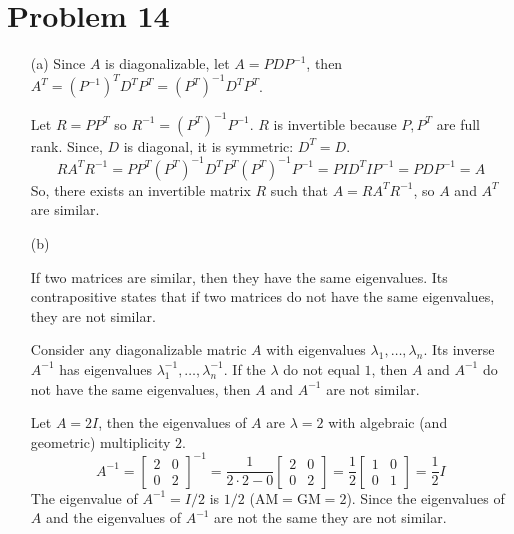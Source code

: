 \documentclass{article}
\newcommand*{\problem}[1]{\section*{Problem #1}}
\begin{document}
\problem{14}
\begin{itemize}
	\item[(a)] Since $A$ is diagonalizable, let $A=PDP^{-1}$, then $A^T=\left(P^{-1}\right)^T D^T P^T=\left(P^T\right)^{-1} D^TP^T$. 

	Let $R=PP^T$ so $R^{-1}=\left(P^{T}\right)^{-1}P^{-1}$. $R$ is invertible because $P,P^T$ are full rank. Since, $D$ is diagonal, it is symmetric: $D^T=D$.
	\begin{equation*}
		RA^TR^{-1}
		=PP^T \left(P^T\right)^{-1}D^T P^T \left(P^T\right)^{-1}P^{-1}
		=PID^TIP^{-1}
		=PDP^{-1}
		=A
	\end{equation*}
	So, there exists an invertible matrix $R$ such that $A=RA^TR^{-1}$, so $A$ and $A^T$ are similar.

	\item[(b)]  \phantom{}

	\begin{mdframed}
		If two matrices are similar, then they have the same eigenvalues. Its contrapositive states that if two matrices do not have the same eigenvalues, they are not similar.

		Consider any diagonalizable matric $A$ with eigenvalues $\lambda_1,\ldots,\lambda_n$. Its inverse $A^{-1}$ has eigenvalues $\lambda_1^{-1},\ldots,\lambda_n^{-1}$. If the $\lambda$ do not equal $1$, then $A$ and $A^{-1}$ do not have the same eigenvalues, then $A$ and $A^{-1}$ are not similar.
	\end{mdframed}

	Let $A=2I$, then the eigenvalues of $A$ are $\lambda=2$ with algebraic (and geometric) multiplicity $2$.
	\begin{equation*}
		A^{-1}=\begin{bmatrix}
			2 & 0 \\
			0 & 2
		\end{bmatrix}^{-1}
		=\frac{1}{2\cdot2-0}\begin{bmatrix}
			2 & 0 \\
			0 & 2
		\end{bmatrix}
		=\frac{1}{2}\begin{bmatrix}
			1 & 0 \\
			0 & 1
		\end{bmatrix}
		=\frac12I
	\end{equation*}
	The eigenvalue of $A^{-1}=I/2$ is $1/2$ ($\mathrm{AM}=\mathrm{GM}=2$). Since the eigenvalues of $A$ and the eigenvalues of $A^{-1}$ are not the same they are not similar.
\end{itemize}
\end{document}
